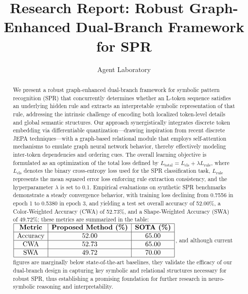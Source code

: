 \documentclass{article}
\title{Research Report: Robust Graph-Enhanced Dual-Branch Framework for SPR}
\author{Agent Laboratory}
\date{}
\begin{document}
\maketitle

\begin{abstract}
We present a robust graph-enhanced dual-branch framework for symbolic pattern recognition (SPR) that concurrently determines whether an L-token sequence satisfies an underlying hidden rule and extracts an interpretable symbolic representation of that rule, addressing the intrinsic challenge of encoding both localized token-level details and global semantic structures. Our approach synergistically integrates discrete token embedding via differentiable quantization—drawing inspiration from recent discrete JEPA techniques—with a graph-based relational module that employs self-attention mechanisms to emulate graph neural network behavior, thereby effectively modeling inter-token dependencies and ordering cues. The overall learning objective is formulated as an optimization of the total loss defined by \( L_{\text{total}} = L_{\text{cls}} + \lambda L_{\text{rule}} \), where \( L_{\text{cls}} \) denotes the binary cross-entropy loss used for the SPR classification task, \( L_{\text{rule}} \) represents the mean squared error loss enforcing rule extraction consistency, and the hyperparameter \(\lambda\) is set to 0.1. Empirical evaluations on synthetic SPR benchmarks demonstrate a steady convergence behavior, with training loss declining from 0.7556 in epoch 1 to 0.5380 in epoch 3, and yielding a test set overall accuracy of 52.00\%, a Color-Weighted Accuracy (CWA) of 52.73\%, and a Shape-Weighted Accuracy (SWA) of 49.72\%; these metrics are summarized in the table: \(\begin{array}{|c|c|c|}\hline \textbf{Metric} & \textbf{Proposed Method (\%)} & \textbf{SOTA (\%)} \\ \hline \text{Accuracy} & 52.00 & 65.00 \\ \hline \text{CWA} & 52.73 & 65.00 \\ \hline \text{SWA} & 49.72 & 70.00 \\ \hline \end{array}\), and although current figures are marginally below state-of-the-art baselines, they validate the efficacy of our dual-branch design in capturing key symbolic and relational structures necessary for robust SPR, thus establishing a promising foundation for further research in neuro-symbolic reasoning and interpretability.
\end{abstract}
\end{document}
